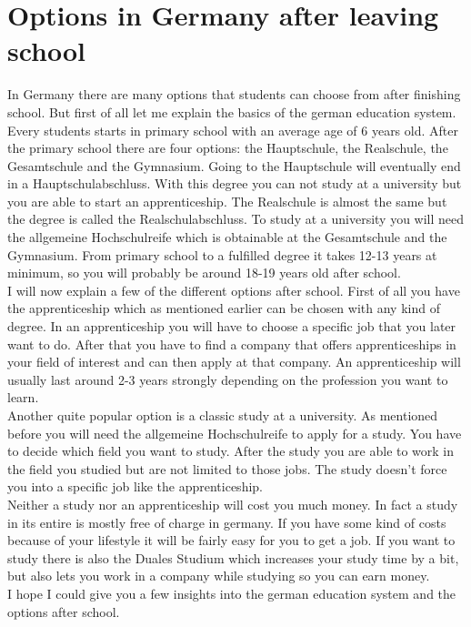 \documentclass[12pt,a4paper]{report}
\begin{document}
	\section{Options in Germany after leaving school}
	In Germany there are many options that students can choose from after finishing school.
	But first of all let me explain the basics of the german education system.
	Every students starts in primary school with an average age of 6 years old.
	After the primary school there are four options: the Hauptschule, the Realschule, the Gesamtschule and the Gymnasium.
	Going to the Hauptschule will eventually end in a Hauptschulabschluss.
	With this degree you can not study at a university but you are able to start an apprenticeship.
	The Realschule is almost the same but the degree is called the Realschulabschluss.
	To study at a university you will need the allgemeine Hochschulreife which is obtainable at the Gesamtschule and the Gymnasium.
	From primary school to a fulfilled degree it takes 12-13 years at minimum, so you will probably be around 18-19 years old after school.
	\\
	I will now explain a few of the different options after school.
	First of all you have the apprenticeship which as mentioned earlier can be chosen with any kind of degree.
	In an apprenticeship you will have to choose a specific job that you later want to do.
	After that you have to find a company that offers apprenticeships in your field of interest and can then apply at that company.
	An apprenticeship will usually last around 2-3 years strongly depending on the profession you want to learn.
	\\
	Another quite popular option is a classic study at a university.
	As mentioned before you will need the allgemeine Hochschulreife to apply for a study.
	You have to decide which field you want to study.
	After the study you are able to work in the field you studied but are not limited to those jobs.
	The study doesn't force you into a specific job like the apprenticeship.
	\\
	Neither a study nor an apprenticeship will cost you much money.
	In fact a study in its entire is mostly free of charge in germany.
	If you have some kind of costs because of your lifestyle it will be fairly easy for you to get a job.
	If you want to study there is also the Duales Studium which increases your study time by a bit, but also lets you work in a company while studying so you can earn money.
	\\
	I hope I could give you a few insights into the german education system and the options after school.
\end{document}
